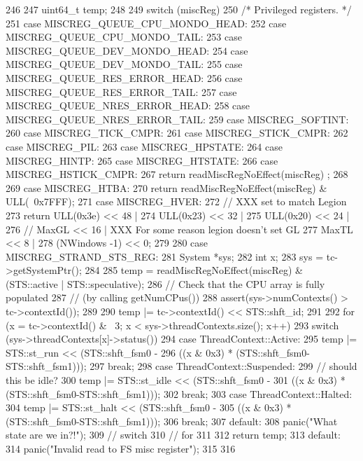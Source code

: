 \begin{DoxyCode}
246 {
247     uint64_t temp;
248 
249     switch (miscReg) {
250         /* Privileged registers. */
251       case MISCREG_QUEUE_CPU_MONDO_HEAD:
252       case MISCREG_QUEUE_CPU_MONDO_TAIL:
253       case MISCREG_QUEUE_DEV_MONDO_HEAD:
254       case MISCREG_QUEUE_DEV_MONDO_TAIL:
255       case MISCREG_QUEUE_RES_ERROR_HEAD:
256       case MISCREG_QUEUE_RES_ERROR_TAIL:
257       case MISCREG_QUEUE_NRES_ERROR_HEAD:
258       case MISCREG_QUEUE_NRES_ERROR_TAIL:
259       case MISCREG_SOFTINT:
260       case MISCREG_TICK_CMPR:
261       case MISCREG_STICK_CMPR:
262       case MISCREG_PIL:
263       case MISCREG_HPSTATE:
264       case MISCREG_HINTP:
265       case MISCREG_HTSTATE:
266       case MISCREG_HSTICK_CMPR:
267         return readMiscRegNoEffect(miscReg) ;
268 
269       case MISCREG_HTBA:
270         return readMiscRegNoEffect(miscReg) & ULL(~0x7FFF);
271       case MISCREG_HVER:
272         // XXX set to match Legion
273         return ULL(0x3e) << 48 |
274                ULL(0x23) << 32 |
275                ULL(0x20) << 24 |
276                    // MaxGL << 16 | XXX For some reason legion doesn't set GL
277                    MaxTL << 8  |
278            (NWindows -1) << 0;
279 
280       case MISCREG_STRAND_STS_REG:
281         System *sys;
282         int x;
283         sys = tc->getSystemPtr();
284 
285         temp = readMiscRegNoEffect(miscReg) & (STS::active | STS::speculative);
286         // Check that the CPU array is fully populated
287         // (by calling getNumCPus())
288         assert(sys->numContexts() > tc->contextId());
289 
290         temp |= tc->contextId()  << STS::shft_id;
291 
292         for (x = tc->contextId() & ~3; x < sys->threadContexts.size(); x++) {
293             switch (sys->threadContexts[x]->status()) {
294               case ThreadContext::Active:
295                 temp |= STS::st_run << (STS::shft_fsm0 -
296                         ((x & 0x3) * (STS::shft_fsm0-STS::shft_fsm1)));
297                 break;
298               case ThreadContext::Suspended:
299                 // should this be idle?
300                 temp |= STS::st_idle << (STS::shft_fsm0 -
301                         ((x & 0x3) * (STS::shft_fsm0-STS::shft_fsm1)));
302                 break;
303               case ThreadContext::Halted:
304                 temp |= STS::st_halt << (STS::shft_fsm0 -
305                         ((x & 0x3) * (STS::shft_fsm0-STS::shft_fsm1)));
306                 break;
307               default:
308                 panic("What state are we in?!\n");
309             } // switch
310         } // for
311 
312         return temp;
313       default:
314         panic("Invalid read to FS misc register\n");
315     }
316 }
\end{DoxyCode}
